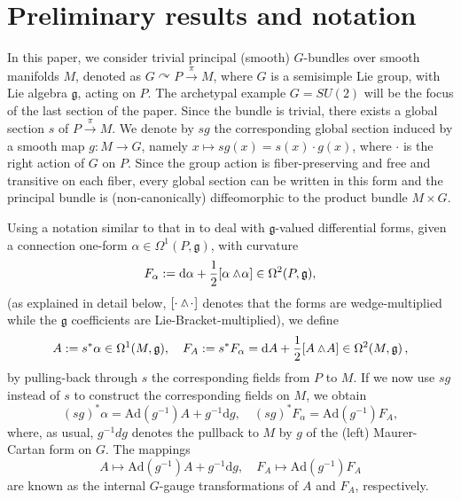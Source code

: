 \documentclass[12pt]{amsart}
\theoremstyle{plain}
\theoremstyle{definition}
\theoremstyle{remark}
\newcommand{\wed}{\wedge\hspace*{-7.5pt}.\hspace*{3pt}}
\numberwithin{equation}{section}  %
\begin{document}
\section{Preliminary results and notation}{\label{sec_preliminary}}
In this paper, we consider trivial principal (smooth) \( G \)-bundles over smooth manifolds \( M \), denoted as \( G \curvearrowright P \overset{\pi}{\to} M \), where \( G \) is a semisimple Lie group, with Lie algebra \( \mathfrak{g} \), acting on $P$. The archetypal example \( G = SU(2) \) will be the focus of the last section of the paper. Since the bundle is trivial, there exists a global section \( s \) of \( P \overset{\pi}{\to} M \). We denote by \( sg \) the corresponding global section induced by a smooth map \( g: M \to G \), namely \(x\mapsto sg(x)=s(x)\cdot g(x)\), where $\cdot$ is the right action of \(G\) on \(P\). Since the group action is fiber-preserving  and free and transitive on each fiber, every global section can be written in this form and the principal bundle is (non-canonically)  diffeomorphic to the product bundle \(M\times G\).

Using a notation similar to that in \cite{Freed1995} to deal with $\mathfrak{g}$-valued differential forms, given a connection one-form \( \alpha \in \Omega^1(P, \mathfrak{g}) \), with curvature  
\[
F_\alpha := \mathrm{d}\alpha + \frac{1}{2} [\alpha \wed \alpha] \in \Omega^2(P, \mathfrak{g}),
\]  
(as explained in detail below, ${[\cdot \wed \!\cdot{}\!]}$ denotes that the forms are wedge-multiplied while the $\mathfrak{g}$ coefficients are Lie-Bracket-multiplied), we define  
\[
A := s^*\alpha \in \Omega^1(M, \mathfrak{g}), \quad F_A := s^*F_\alpha = \mathrm{d}A + \frac{1}{2} [A \wed A] \in \Omega^2(M, \mathfrak{g})\,,
\]  
by pulling-back through $s$ the corresponding fields from $P$ to $M$. If we now use \( sg \) instead of \( s \) to construct the corresponding fields on \( M \), we obtain  
\[
(sg)^*\alpha = \mathrm{Ad}(g^{-1})A + g^{-1} \mathrm{d} g, \quad (sg)^*F_\alpha = \mathrm{Ad}(g^{-1}) F_A,
\]  
where, as usual, \( g^{-1} dg \) denotes the pullback to \( M \) by \( g \) of the (left) Maurer-Cartan form on \( G \).   The mappings  
\[
A \mapsto \mathrm{Ad}(g^{-1})A + g^{-1} \mathrm{d} g, \quad F_A \mapsto \mathrm{Ad}(g^{-1})F_A
\]  
are known as the internal \( G \)-gauge transformations of \( A \) and \( F_A \), respectively.  
\end{document}
